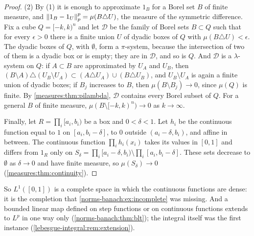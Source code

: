 \begin{notechapter}
\begin{proof}
(2) By (1) it is enough to approximate $1_B$ for a Borel set $B$ of
finite measure, and $\left\|1_B - 1_U\right\|_p^p = \mu(B\triangle U)$,
the measure of the symmetric difference. Fix a cube $Q = [-k, k)^n$ and
let $\mathcal D$ be the family of Borel sets $B\subset Q$ such that for
every $\epsilon > 0$ there is a finite union $U$ of dyadic boxes of $Q$
with $\mu(B\triangle U) < \epsilon$. The dyadic boxes of $Q$, with
$\emptyset$, form a $\pi$-system, because the intersection of two of
them is a dyadic box or is empty; they are in $\mathcal D$, and so is
$Q$. And $\mathcal D$ is a $\lambda$-system on $Q$: if $A\subset B$ are
approximated by $U_A$ and $U_B$, then
$(B\setminus A)\triangle(U_B\setminus U_A)
\subset(A\triangle U_A)\cup(B\triangle U_B)$,
and $U_B\setminus U_A$ is again a finite union of dyadic boxes; if $B_j$
increases to $B$, then $\mu(B\setminus B_j)\to0$, since $\mu(Q)$ is
finite. By \cref{measures:thm:pilambda}, $\mathcal D$ contains every
Borel subset of $Q$. For a general $B$ of finite measure,
$\mu(B\setminus[-k, k)^n)\to0$ as $k\to\infty$.

Finally, let $R = \prod_i[a_i, b_i)$ be a box and $0 < \delta < 1$. Let
$h_i$ be the continuous function equal to $1$ on
$[a_i, b_i - \delta]$, to $0$ outside $(a_i - \delta, b_i)$, and affine
in between. The continuous function $\prod_ih_i(x_i)$ takes its values
in $[0, 1]$ and differs from $1_R$ only on
$S_\delta = \prod_i[a_i - \delta, b_i)\setminus
\prod_i[a_i, b_i - \delta]$. These sets decrease to $\emptyset$ as
$\delta\to0$ and have finite measure, so $\mu(S_\delta)\to0$
(\cref{measures:thm:continuity}).
\end{proof}

So $L^1([0, 1])$ is a complete space in which the continuous functions
are dense: it is the completion that
\cref{norms-banach:ex:incomplete} was missing. And a bounded linear map
defined on step functions or on continuous functions extends to $L^p$
in one way only (\cref{norms-banach:thm:blt}); the integral itself was
the first instance (\cref{lebesgue-integral:rem:extension}).


\end{notechapter}
